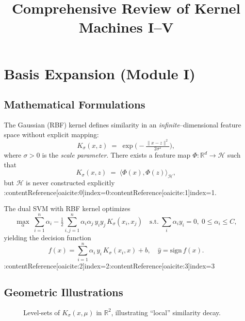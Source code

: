 \documentclass[11pt]{article}
\title{Comprehensive Review of Kernel Machines I--V}
\author{}
\date{}
\begin{document}
\maketitle
\tableofcontents
\newpage

\section{Basis Expansion (Module I)}

\subsection{Mathematical Formulations}
The Gaussian (RBF) kernel defines similarity in an \emph{infinite}–dimensional feature space without explicit mapping:
\[
K_\sigma(x,z) \;=\;\exp\!\bigl(-\tfrac{\|x-z\|^2}{2\sigma^2}\bigr),
\]
where $\sigma>0$ is the \emph{scale parameter}.  There exists a feature map $\Phi: \mathbb{R}^d\to\mathcal{H}$ such that
\[
K_\sigma(x,z) \;=\;\langle \Phi(x),\Phi(z)\rangle_{\mathcal{H}},
\]
but $\mathcal{H}$ is never constructed explicitly :contentReference[oaicite:0]{index=0}:contentReference[oaicite:1]{index=1}.

The dual SVM with RBF kernel optimizes
\[
\max_{\alpha}\;\sum_{i=1}^n \alpha_i
-\tfrac{1}{2}\sum_{i,j=1}^n\alpha_i\alpha_j\,y_i y_j\,K_\sigma(x_i,x_j)
\quad\text{s.t.}\;\sum_i \alpha_i y_i=0,\;0\le \alpha_i\le C,
\]
yielding the decision function
\[
f(x)=\sum_{i=1}^n \alpha_i\,y_i\,K_\sigma(x_i,x) + b,\quad
\hat y=\mathrm{sign}\,f(x).
\] :contentReference[oaicite:2]{index=2}:contentReference[oaicite:3]{index=3}

\subsection{Geometric Illustrations}
\begin{figure}[h]
  \centering
  \caption{Level‐sets of $K_\sigma(x,\mu)$ in $\mathbb{R}^2$, illustrating “local” similarity decay.}
\end{figure}
\end{document}
